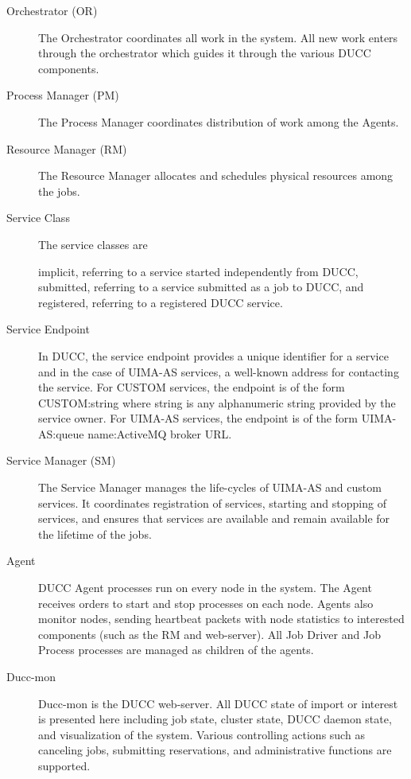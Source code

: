 \begin{description}
\item[Orchestrator (OR) ] The Orchestrator coordinates all work in the system. All new work enters
  through the orchestrator which guides it through the various DUCC components.

\item[Process Manager (PM) ] The Process Manager coordinates distribution of work among the Agents.

\item[Resource Manager (RM) ] The Resource Manager allocates and schedules physical resources among
  the jobs.

\item[Service Class ] The service classes are

implicit, referring to a service started independently from DUCC, 
submitted, referring to a service submitted as a job to DUCC, and 
registered, referring to a registered DUCC service. 


\item[Service Endpoint ] In DUCC, the service endpoint provides a unique identifier for a service
  and in the case of UIMA-AS services, a well-known address for contacting the service. For CUSTOM
  services, the endpoint is of the form CUSTOM:string where string is any alphanumeric string
  provided by the service owner. For UIMA-AS services, the endpoint is of the form UIMA-AS:queue
  name:ActiveMQ broker URL.

\item[Service Manager (SM)] The Service Manager manages the life-cycles of UIMA-AS and custom
  services. It coordinates registration of services, starting and stopping of services, and ensures
  that services are available and remain available for the lifetime of the jobs.

\item[Agent] DUCC Agent processes run on every node in the system. The Agent receives orders to
  start and stop processes on each node. Agents also monitor nodes, sending heartbeat packets with
  node statistics to interested components (such as the RM and web-server). All Job Driver and Job
  Process processes are managed as children of the agents.

\item[Ducc-mon]  Ducc-mon is the DUCC web-server. All DUCC state of import or interest is presented
  here including job state, cluster state, DUCC daemon state, and visualization of the system.
  Various controlling actions such as canceling jobs, submitting reservations, and administrative
  functions are supported.


\end{description}
